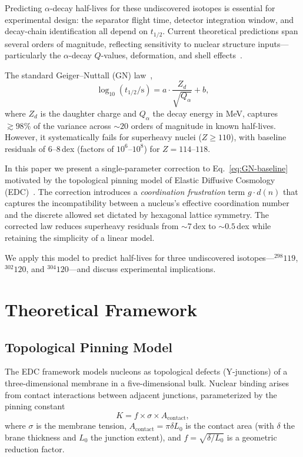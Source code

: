 \documentclass[12pt,a4paper,twocolumn]{revtex4-2}
\newcommand{\thalf}{t_{1/2}}
\newcommand{\Qalpha}{Q_\alpha}
\newcommand{\Zd}{Z_d}
\newcommand{\dn}{d(n)}
\begin{document}
Predicting $\alpha$-decay half-lives for these undiscovered
isotopes is essential for experimental design: the separator
flight time, detector integration window, and decay-chain
identification all depend on $\thalf$.  Current theoretical
predictions span several orders of magnitude, reflecting
sensitivity to nuclear structure inputs---particularly the
$\alpha$-decay $Q$-values, deformation, and shell
effects~\cite{Sobiczewski2018,Bao2015}.

The standard Geiger--Nuttall (GN) law~\cite{Geiger1911},
\begin{equation}
  \log_{10}(\thalf/\text{s}) = a \cdot \frac{\Zd}{\sqrt{\Qalpha}}
    + b,
  \label{eq:GN-baseline}
\end{equation}
where $\Zd$ is the daughter charge and $\Qalpha$ the decay
energy in MeV, captures $\gtrsim 98\%$ of the variance across
$\sim 20$ orders of magnitude in known half-lives.  However, it
systematically fails for superheavy nuclei ($Z \geq 110$), with
baseline residuals of $6$--$8$\,dex (factors of $10^6$--$10^8$)
for $Z = 114$--$118$.

In this paper we present a single-parameter correction to
Eq.~\eqref{eq:GN-baseline} motivated by the topological pinning
model of Elastic Diffusive Cosmology
(EDC)~\cite{EDCBook4}.  The correction introduces a
\emph{coordination frustration} term $g \cdot \dn$ that captures
the incompatibility between a nucleus's effective coordination
number and the discrete allowed set dictated by hexagonal lattice
symmetry.  The corrected law reduces superheavy residuals from
$\sim 7$\,dex to $\sim 0.5$\,dex while retaining the simplicity
of a linear model.

We apply this model to predict half-lives for three undiscovered
isotopes---${}^{298}119$, ${}^{302}120$, and
${}^{304}120$---and discuss experimental implications.

\section{Theoretical Framework}
\label{sec:theory}

\subsection{Topological Pinning Model}

The EDC framework models nucleons as topological defects
(Y-junctions) of a three-dimensional membrane in a
five-dimensional bulk.  Nuclear binding arises from contact
interactions between adjacent junctions, parameterized by the
pinning constant
\begin{equation}
  K = f \times \sigma \times A_{\mathrm{contact}},
  \label{eq:K}
\end{equation}
where $\sigma$ is the membrane tension, $A_{\mathrm{contact}} =
\pi \delta L_0$ is the contact area (with $\delta$ the brane
thickness and $L_0$ the junction extent), and $f = \sqrt{\delta/L_0}$
is a geometric reduction factor.
\end{document}
